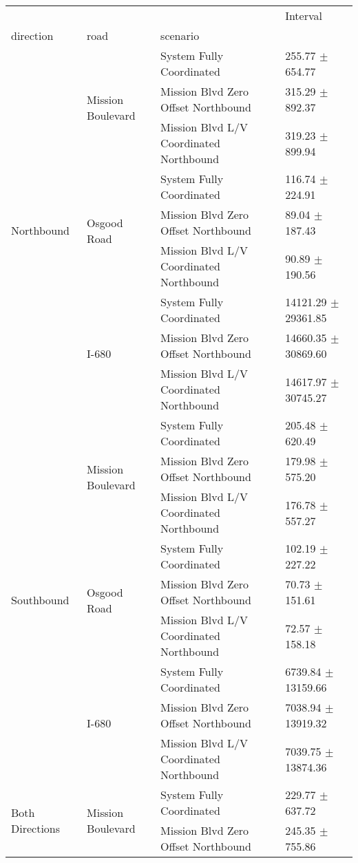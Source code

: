 \begin{tabular}{llll}
\toprule
 &  &  & Interval \\
direction & road & scenario &  \\
\midrule
\multirow[t]{9}{*}{Northbound} & \multirow[t]{3}{*}{Mission Boulevard} & System Fully Coordinated & 255.77 $\pm$ 654.77 \\
 &  & Mission Blvd Zero Offset Northbound & 315.29 $\pm$ 892.37 \\
 &  & Mission Blvd L/V Coordinated Northbound & 319.23 $\pm$ 899.94 \\
 & \multirow[t]{3}{*}{Osgood Road} & System Fully Coordinated & 116.74 $\pm$ 224.91 \\
 &  & Mission Blvd Zero Offset Northbound & 89.04 $\pm$ 187.43 \\
 &  & Mission Blvd L/V Coordinated Northbound & 90.89 $\pm$ 190.56 \\
 & \multirow[t]{3}{*}{I-680} & System Fully Coordinated & 14121.29 $\pm$ 29361.85 \\
 &  & Mission Blvd Zero Offset Northbound & 14660.35 $\pm$ 30869.60 \\
 &  & Mission Blvd L/V Coordinated Northbound & 14617.97 $\pm$ 30745.27 \\
\multirow[t]{9}{*}{Southbound} & \multirow[t]{3}{*}{Mission Boulevard} & System Fully Coordinated & 205.48 $\pm$ 620.49 \\
 &  & Mission Blvd Zero Offset Northbound & 179.98 $\pm$ 575.20 \\
 &  & Mission Blvd L/V Coordinated Northbound & 176.78 $\pm$ 557.27 \\
 & \multirow[t]{3}{*}{Osgood Road} & System Fully Coordinated & 102.19 $\pm$ 227.22 \\
 &  & Mission Blvd Zero Offset Northbound & 70.73 $\pm$ 151.61 \\
 &  & Mission Blvd L/V Coordinated Northbound & 72.57 $\pm$ 158.18 \\
 & \multirow[t]{3}{*}{I-680} & System Fully Coordinated & 6739.84 $\pm$ 13159.66 \\
 &  & Mission Blvd Zero Offset Northbound & 7038.94 $\pm$ 13919.32 \\
 &  & Mission Blvd L/V Coordinated Northbound & 7039.75 $\pm$ 13874.36 \\
\multirow[t]{9}{*}{Both Directions} & \multirow[t]{3}{*}{Mission Boulevard} & System Fully Coordinated & 229.77 $\pm$ 637.72 \\
 &  & Mission Blvd Zero Offset Northbound & 245.35 $\pm$ 755.86 \\

\end{tabular}
